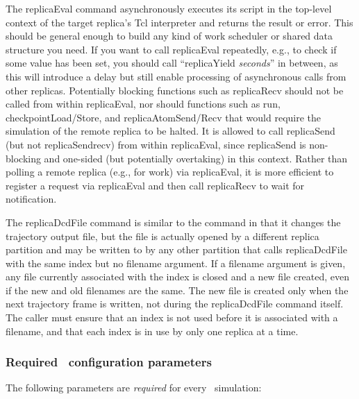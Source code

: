 The replicaEval command asynchronously executes its script in the top-level context
of the target replica's Tcl interpreter and returns the result or error.
This should be general enough to build any kind of work scheduler or shared data structure you need.
If you want to call replicaEval repeatedly, e.g., to check if some value has been set,
you should call ``replicaYield {\em seconds}'' in between, as this will introduce a delay but
still enable processing of asynchronous calls from other replicas.
Potentially blocking functions such as replicaRecv should not be called from within replicaEval,
nor should functions such as run, checkpointLoad/Store, and replicaAtomSend/Recv that would
require the simulation of the remote replica to be halted.
It is allowed to call replicaSend (but not replicaSendrecv) from within replicaEval, since
replicaSend is non-blocking and one-sided (but potentially overtaking) in this context.
Rather than polling a remote replica (e.g., for work) via replicaEval, it is more efficient
to register a request via replicaEval and then call replicaRecv to wait for notification.

The replicaDcdFile command is similar to the  command in that it changes the
trajectory output file, but the file is actually opened by a different replica partition
and may be written to by any other partition that calls replicaDcdFile with the same index
but no filename argument.  If a filename argument is given, any file currently associated
with the index is closed and a new file created, even if the new and old filenames are the same.
The new file is created only when the next trajectory frame is written,
not during the replicaDcdFile command itself.
The caller must ensure that an index is not used before it is associated with a filename,
and that each index is in use by only one replica at a time.

\subsubsection{Required \NAMD\ configuration parameters}
\label{section:requiredparams}

The following parameters are {\em required} for every
\NAMD\ simulation:

